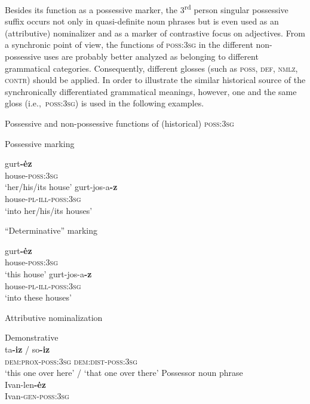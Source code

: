 Besides its function as a possessive marker, the 3\textsuperscript{rd} person singular possessive suffix occurs not only in quasi-definite noun phrases but is even used as an (attributive) nominalizer and as a marker of contrastive focus on adjectives. From a synchronic point of view, the functions of \textsc{poss:3sg} in the different non-possessive uses are probably better analyzed as belonging to different grammatical categories. Consequently, different glosses (such as \textsc{poss, def, nmlz, contr}) should be applied. In order to illustrate the similar historical source of the synchronically differentiated grammatical meanings, however, one and the same gloss (i.e.,~\textsc{poss:3sg}) is used in the following examples.
\begin{exe}
\ex \rm{Possessive and non-possessive functions of (historical) \textsc{poss:3sg}}
\begin{xlist}
\ex \rm{Possessive marking} \label{udmurt possmarking}
\begin{xlist}
\ex	
\gll	gurt\textbf{-ėz}\\
	house-\textsc{poss:3sg}\\
\glt	‘her/his/its house’
\ex	
\gll	gurt-jos-a\textbf{-z}\\
	house-\textsc{pl}-\textsc{ill}-\textsc{poss:3sg}\\
\glt	‘into her/his/its houses’
\end{xlist}
\ex \rm{“Determinative” marking}
\begin{xlist}
\ex	
\gll	gurt\textbf{-ėz}\\
	house-\textsc{poss:3sg}\\
\glt	‘this house’
\ex	
\gll	gurt-jos-a\textbf{-z}\\
	house-\textsc{pl}-\textsc{ill}-\textsc{poss:3sg}\\
\glt	‘into these houses’
\end{xlist}
\ex	\rm{Attributive nominalization} \label{udmurt diachr nomzr}
\begin{xlist}
\ex \rm{Demonstrative}\\ \label{udmurt diachr dem-nomzr}
\gll	ta\textbf{-iz} / so\textbf{-iz}\\
 	\textsc{dem:prox}-\textsc{poss:3sg} {} \textsc{dem:dist}-\textsc{poss:3sg}\\
\glt	‘this one over here’ / ‘that one over there’
\ex 	\rm{Possessor noun phrase}\\ \label{udmurt diachr gen-nomzr}
\gll	Ivan-len\textbf{-ėz}\\
	Ivan-\textsc{gen}-\textsc{poss:3sg}\\

\end{xlist}
\end{xlist}
\end{exe}
